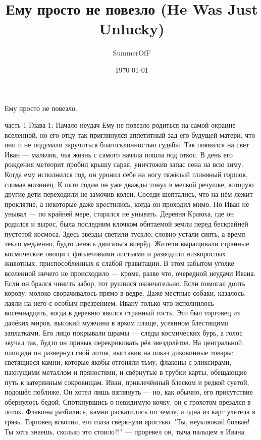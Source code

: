 \documentclass[12pt,a4paper]{book}
\title{Ему просто не повезло (He Was Just Unlucky)}
\author{SummerOfF}
\date{\today}
\begin{document}
\maketitle
\tableofcontents

Ему просто не повезло. 

часть 1
Глава 1: Начало неудач
Ему не повезло родиться на самой окраине вселенной, но его отцу так приглянулся аппетитный зад его будущей матери, что они и не подумали заручиться благосклонностью судьбы. Так появился на свет Иван — мальчик, чья жизнь с самого начала пошла под откос. В день его рождения метеорит пробил крышу сарая, уничтожив запас сена на всю зиму. Когда ему исполнился год, он уронил себе на ногу тяжёлый глиняный горшок, сломав мизинец. К пяти годам он уже дважды тонул в мелкой речушке, которую другие дети переходили не замочив колен. Соседи шептались, что на нём лежит проклятие, а некоторые даже крестились, когда он проходил мимо. Но Иван не унывал — по крайней мере, старался не унывать.
Деревня Краюха, где он родился и вырос, была последним клочком обитаемой земли перед бескрайней пустотой космоса. Здесь звёзды светили тускло, словно устали сиять, а время текло медленно, будто ленясь двигаться вперёд. Жители выращивали странные космические овощи с фиолетовыми листьями и разводили низкорослых животных, приспособленных к слабой гравитации. В этом забытом уголке вселенной ничего не происходило — кроме, разве что, очередной неудачи Ивана. Если он брался чинить забор, тот рушился окончательно. Если помогал доить корову, молоко сворачивалось прямо в ведре. Даже местные собаки, казалось, лаяли на него с особым презрением.
Ивану только что исполнилось восемнадцать, когда в деревню явился странный гость. Это был торговец из далёких миров, высокий мужчина в ярком плаще, усеянном блестящими заплатками. Его лицо покрывали шрамы — следы космических бурь, а голос звучал так, будто он привык перекрикивать рёв звездолётов. На центральной площади он развернул свой лоток, выставив на показ диковинные товары: светящиеся камни, которые якобы отгоняли тьму, флаконы с эликсирами, пахнущими металлом и пряностями, и свёрнутые в трубки карты, обещающие путь к затерянным сокровищам.
Иван, привлечённый блеском и редкой суетой, подошёл поближе. Он хотел лишь взглянуть — но, как обычно, его присутствие обернулось бедой. Споткнувшись о невидимую кочку, он с грохотом врезался в лоток. Флаконы разбились, камни раскатились по земле, а одна из карт улетела в грязь. Торговец вскочил, его глаза сверкнули яростью.
"Ты, неуклюжий болван! Ты хоть знаешь, сколько это стоило?!" — проревел он, тыча пальцем в Ивана.
\end{document}
